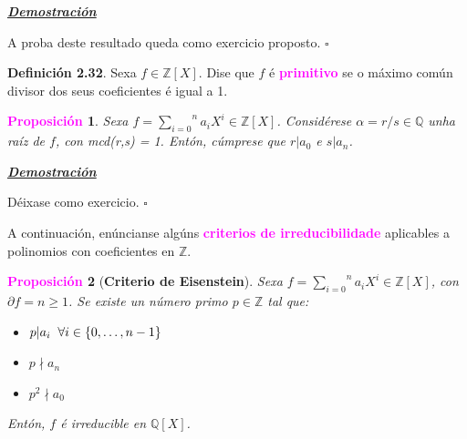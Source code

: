 \documentclass[twoside]{report}
\newcommand{\magbf}[1]{\textcolor{magenta}{\textbf{#1}}} %
\theoremstyle{mystyle}
\newtheorem{prop}{\magbf{Proposición}}[chapter]
\newenvironment{proposition}
{\begin{mdframed}[linecolor = magenta,backgroundcolor = classicrose, linewidth = 2mm]\begin{prop}}
{\end{prop}\end{mdframed}}
\begin{document}
\vspace{2mm}

\noindent \textbf{\textit{\underline{Demostración}}}

\vspace{2mm}

\noindent A proba deste resultado queda como exercicio proposto. $\square$\\

\vspace{3mm}

\noindent \textbf{Definición 2.32}. Sexa $f \in \mathbb{Z}[X]$. Dise que $f$ é \magbf{primitivo} se o máximo común divisor dos seus coeficientes é igual a 1.\\

\begin{proposition} \label{prop2.25}
Sexa $f = \overset{n}{\underset{i = 0}{\sum}}a_{i}X^{i} \in \mathbb{Z}[X]$. Considérese $\alpha = r/s \in \mathbb{Q}$ unha raíz de $f$, con mcd(r,s) = 1. Entón, cúmprese que $r|a_{0}$ e $s|a_{n}$.
\end{proposition}

\vspace{2mm}

\noindent \textbf{\textit{\underline{Demostración}}}

\vspace{2mm}

\noindent Déixase como exercicio. $\square$\\

\pagebreak

\noindent A continuación, enúncianse algúns \magbf{criterios de irreducibilidade} aplicables a polinomios con coeficientes en $\mathbb{Z}$.\\

\begin{proposition}[\textbf{Criterio de Eisenstein}] \label{prop2.26}
Sexa $f = \overset{n}{\underset{i = 0}{\sum}}a_{i}X^{i} \in \mathbb{Z}[X]$, con $\partial f = n \geq 1$. Se existe un número primo $p \in \mathbb{Z}$ tal que:
\begin{itemize}
    \item $p|a_{i} \hspace{2mm} \forall i \in \{0, \ldots, n-1\}$
    \item $p \nmid a_{n}$
    \item $p^{2} \nmid a_{0}$
\end{itemize}
\noindent Entón, $f$ é irreducible en $\mathbb{Q}[X]$.
\end{proposition}
\end{document}
